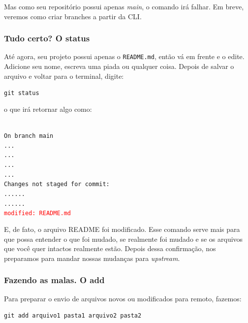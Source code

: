 \documentclass{article}
\begin{document}
  Mas como seu repositório possui apenas \textit{main}, o comando irá falhar. Em breve, veremos como criar branches a partir da CLI.

  \subsubsection{Tudo certo? O status}

  Até agora, seu projeto possui apenas o \texttt{README.md}, então vá em frente e o edite. Adicione seu nome, escreva uma piada ou 
  qualquer coisa. Depois de salvar o arquivo e voltar para o terminal, digite: 

  \vspace{1ex}
  \texttt{git status}
  \vspace{1ex}

  o que irá retornar algo como: 

  \vspace{1ex}
  \texttt{\\
  \noindent On branch main\\
  \noindent ...\\
  \noindent ...\\
  \noindent ...\\
  \noindent ...\\
  \noindent Changes not staged for commit:\\
  \noindent ......\\
  \noindent ......\\
  \noindent \textcolor{red}{modified:   README.md}}
  \vspace{1ex}


  E, de fato, o arquivo README foi modificado. Esse comando serve mais para que possa entender o que foi mudado, se realmente foi 
  mudado e se os arquivos que você quer intactos realmente estão. Depois dessa confirmação, nos preparamos para mandar nossas
  mudanças para \textit{upstream}. 
  
  \subsubsection{Fazendo as malas. O add}
  \label{sec:add}

  Para preparar o envio de arquivos novos ou modificados para remoto, fazemos: 
  
  \vspace{1ex}
  \texttt{git add arquivo1 pasta1 arquivo2 pasta2}
  \vspace{1ex}
  
\end{document}
